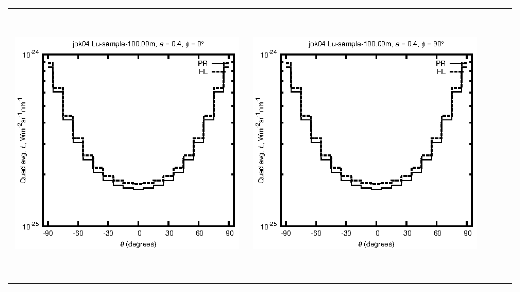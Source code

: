 \documentclass[10pt,a4paper]{article}
\begin{document}
\begin{adjustwidth}{-1.2in}{-1.2in}
\begin{tabular}{c c c c}
\includegraphics[height=7cm]{../eps/jok04_Lu_sample_100.00m_fwd.eps} &
\includegraphics[height=7cm]{../eps/jok04_Lu_sample_100.00m_cross.eps} \\
\end{tabular}

\pagebreak


\end{adjustwidth}
\end{document}
